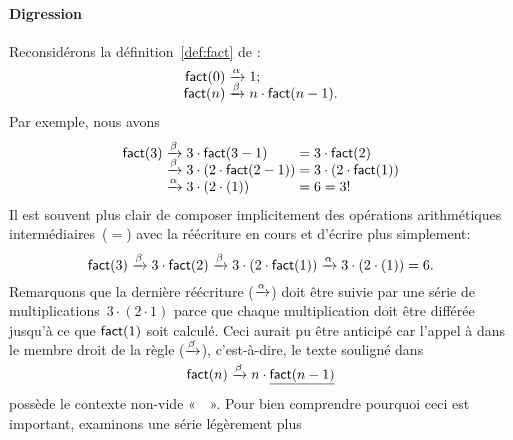 \paragraph{Digression}

Reconsidérons la définition~\eqref{def:fact} de
 :
\begin{equation*}
\begin{array}{r@{\;}l@{\;}l}
\fun{fact}(0) & \smashedrightarrow{\alpha} & 1;\\
\fun{fact}(n) & \smashedrightarrow{\beta} & n \cdot \fun{fact}(n-1).
\end{array}
\end{equation*}
Par exemple, nous avons
\begin{equation*}
\begin{array}{r@{\;}c@{\;}l@{\;}c@{\;}l}
\fun{fact}(3) & \xrightarrow{\beta} & 3 \cdot \fun{fact}(3-1)
              & = & 3 \cdot \fun{fact}(2)\\
              & \xrightarrow{\smash[t]{\beta}} &
              3 \cdot (2 \cdot \fun{fact}(2-1))
              & = & 3 \cdot (2 \cdot \fun{fact}(1))\\
              & \xrightarrow{\smash[t]{\alpha}} &
                3 \cdot (2 \cdot (1)) & = & 6 = 3!
\end{array}
\end{equation*}
Il est souvent plus clair de composer implicitement des opérations
arithmétiques intermédiaires~(\(=\)) avec la réécriture en cours et
d'écrire plus simplement:
\begin{equation*}
\textsf{fact}(3) \xrightarrow{\beta} 3 \cdot \textsf{fact}(2)
\xrightarrow{\smash[t]{\beta}} 3 \cdot (2 \cdot \textsf{fact}(1))
\xrightarrow{\smash[t]{\alpha}} 3 \cdot (2 \cdot (1)) = 6.
\end{equation*}
Remarquons que la dernière réécriture
(\(\xrightarrow{\smash[t]{\alpha}}\)) doit être suivie par une série
de multiplications~\(3 \cdot (2 \cdot 1)\) parce que chaque
multiplication doit être différée jusqu'à ce que \(\textsf{fact}(1)\)
soit calculé. Ceci aurait pu être anticipé car l'appel à 
dans le membre droit de la règle (\(\xrightarrow{\smash[t]{\beta}}\)),
c'est-à-dire, le texte souligné dans
\begin{equation*}
\textsf{fact}(n) \xrightarrow{\smash[t]{\beta}} n \cdot \underline{\textsf{fact}(n-1)}
\end{equation*}
possède le contexte non-vide
«~~». Pour bien comprendre pourquoi
ceci est important, examinons une série légèrement plus
